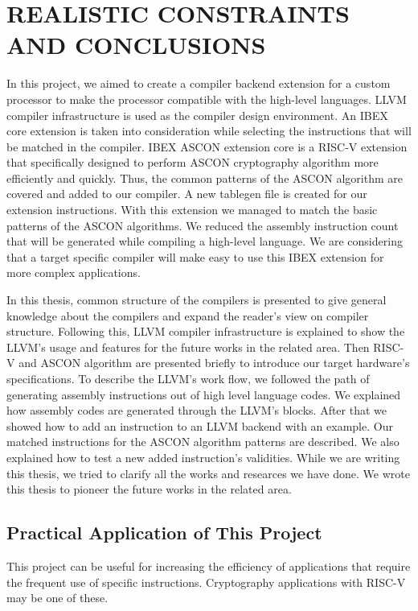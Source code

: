 \chapter{REALISTIC CONSTRAINTS AND CONCLUSIONS}\label{Ch6}

In this project, we aimed to create a compiler backend extension for a custom processor to make the processor compatible with the high-level languages. LLVM compiler infrastructure is used as the compiler design environment. An IBEX core extension is taken into consideration while selecting the instructions that will be matched in the compiler. IBEX ASCON extension core is a RISC-V extension that specifically designed to perform ASCON cryptography algorithm more efficiently and quickly. Thus, the common patterns of the ASCON algorithm are covered and added to our compiler. A new tablegen file is created for our extension instructions. With this extension we managed to match the basic patterns of the ASCON algorithms. We reduced the assembly instruction count that will be generated while compiling a high-level language. We are considering that a target specific compiler will make easy to use this IBEX extension for more complex applications.

In this thesis, common structure of the compilers is presented to give general knowledge about the compilers and expand the reader’s view on compiler structure. Following this, LLVM compiler infrastructure is explained to show the LLVM’s usage and features for the future works in the related area. Then RISC-V and ASCON algorithm are presented briefly to introduce our target hardware’s specifications. To describe the LLVM’s work flow, we followed the path of generating assembly instructions out of high level language codes. We explained how assembly codes are generated through the LLVM’s blocks. After that we showed how to add an instruction to an LLVM backend with an example. Our matched instructions for the ASCON algorithm patterns are described. We also explained how to test a new added instruction’s validities. While we are writing this thesis, we tried to clarify all the works and researces we have done. We wrote this thesis to pioneer the future works in the related area.
\section{Practical Application of This Project}
This project can be useful for increasing the efficiency of applications that require the frequent use of specific instructions. Cryptography applications with RISC-V may be one of these.

